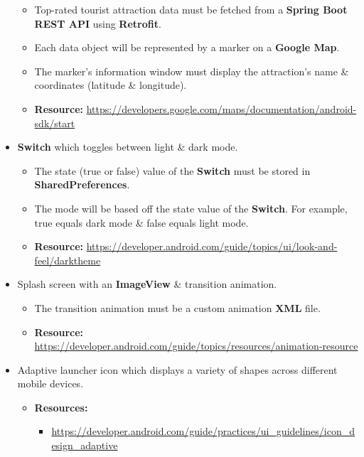 \documentclass{article}
\begin{document}
\begin{itemize}
	      \begin{itemize}
		      \item Top-rated tourist attraction data must be fetched from a \textbf{Spring Boot REST API} using \textbf{Retrofit}.
		      \item Each data object will be represented by a marker on a \textbf{Google Map}.
		      \item The marker's information window must display the attraction's name \& coordinates (latitude \& longitude).
		      \item \textbf{Resource:} \footnotesize\href{https://developers.google.com/maps/documentation/android-sdk/start}{https://developers.google.com/maps/documentation/android-sdk/start}
	      \end{itemize}
	\item \textbf{Switch} which toggles between light \& dark mode.
	      \begin{itemize}
		      \item The state (true or false) value of the \textbf{Switch} must be stored in \textbf{SharedPreferences}.
		      \item The mode will be based off the state value of the \textbf{Switch}. For example, true equals dark mode \& false equals light mode.
		      \item \textbf{Resource:} \footnotesize\href{https://developer.android.com/guide/topics/ui/look-and-feel/darktheme}{https://developer.android.com/guide/topics/ui/look-and-feel/darktheme}
	      \end{itemize}
	\item Splash screen with an \textbf{ImageView} \& transition animation.
	      \begin{itemize}
		      \item The transition animation must be a custom animation \textbf{XML} file.
		      \item \textbf{Resource:} \footnotesize\href{https://developer.android.com/guide/topics/resources/animation-resource}{https://developer.android.com/guide/topics/resources/animation-resource}
	      \end{itemize}
	\item Adaptive launcher icon which displays a variety of shapes across different mobile devices.
	      \begin{itemize}
		      \item \textbf{Resources:}
		            \begin{itemize}
			            \item \footnotesize\href{https://developer.android.com/guide/practices/ui\_guidelines/icon\_design\_adaptive}{https://developer.android.com/guide/practices/ui\_guidelines/icon\_design\_adaptive}

\end{itemize}
\end{itemize}
\end{itemize}
\end{document}
